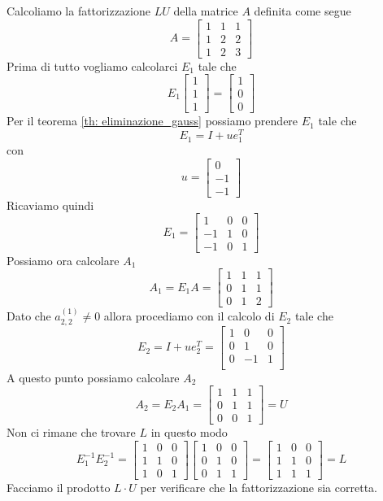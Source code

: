 \begin{example}
	Calcoliamo la fattorizzazione $LU$ della matrice $A$ definita come segue
	\[ A = \begin{bmatrix}
			1 & 1 & 1 \\
			1 & 2 & 2 \\
			1 & 2 & 3
		\end{bmatrix}
	\]
	Prima di tutto vogliamo calcolarci $E_1$ tale che
	\[ E_1 \begin{bmatrix}
			1 \\ 1 \\ 1
		\end{bmatrix} = \begin{bmatrix}
			1 \\ 0 \\ 0
		\end{bmatrix}
	\]
	Per il teorema \ref{th: eliminazione_gauss} possiamo prendere $E_1$ tale che
	\[ E_1 = I + u e_1^T \]
	con
	\[ u = \begin{bmatrix} 0 \\ -1 \\ -1 \end{bmatrix} \]
	Ricaviamo quindi
	\[
		E_1 = \begin{bmatrix}
			1  & 0 & 0 \\
			-1 & 1 & 0 \\
			-1 & 0 & 1
		\end{bmatrix}
	\]
	Possiamo ora calcolare $A_1$
	\[
		A_1 = E_1 A = \begin{bmatrix}
			1 & 1 & 1 \\
			0 & 1 & 1 \\
			0 & 1 & 2
		\end{bmatrix}
	\]
	Dato che $a_{2,2}^{(1)} \neq 0$ allora procediamo con il calcolo di $E_2$ tale che
	\[
		E_2 = I + u e_2^T = \begin{bmatrix}
			1 & 0  & 0 \\
			0 & 1  & 0 \\
			0 & -1 & 1 \\
		\end{bmatrix}
	\]
	A questo punto possiamo calcolare $A_2$
	\[
		A_2 = E_2 A_1 = \begin{bmatrix}
			1 & 1 & 1 \\
			0 & 1 & 1 \\
			0 & 0 & 1
		\end{bmatrix} = U
	\]
	Non ci rimane che trovare $L$ in questo modo
	\[
		E_1^{-1} E_2^{-1} = \begin{bmatrix}
			1 & 0 & 0 \\
			1 & 1 & 0 \\
			1 & 0 & 1
		\end{bmatrix} \begin{bmatrix}
			1 & 0 & 0 \\
			0 & 1 & 0 \\
			0 & 1 & 1
		\end{bmatrix} = \begin{bmatrix}
			1 & 0 & 0 \\
			1 & 1 & 0 \\
			1 & 1 & 1
		\end{bmatrix} = L
	\]
	Facciamo il prodotto $L \cdot U$ per verificare che la fattorizzazione sia corretta.
\end{example}